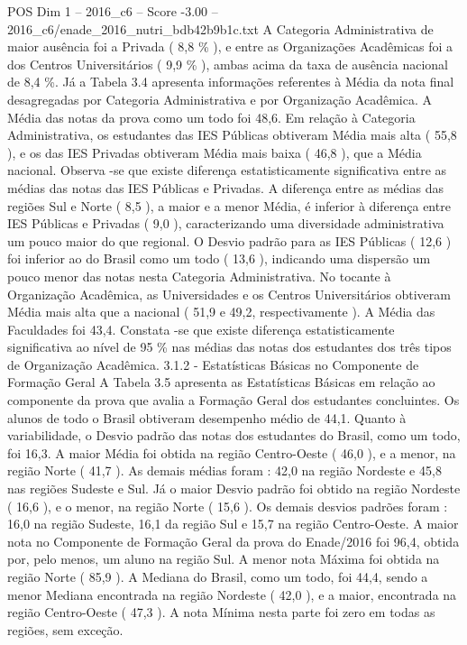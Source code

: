 \begin{textsample}{POS Dim 1 – 2016\_c6 – Score -3.00 – 2016\_c6/enade\_2016\_nutri\_bdb42b9b1c.txt}
A Categoria Administrativa de maior ausência foi a Privada ( 8,8 \% ), e entre as Organizações Acadêmicas foi a dos Centros Universitários ( 9,9 \% ), ambas acima da taxa de ausência nacional de 8,4 \%.
Já a Tabela 3.4 apresenta informações referentes à Média da nota final desagregadas por Categoria Administrativa e por Organização Acadêmica.
A Média das notas da prova como um todo foi 48,6.
Em relação à Categoria Administrativa, os estudantes das IES Públicas obtiveram Média mais alta ( 55,8 ), e os das IES Privadas obtiveram Média mais baixa ( 46,8 ), que a Média nacional.
Observa -se que existe diferença estatisticamente significativa entre as médias das notas das IES Públicas e Privadas.
A diferença entre as médias das regiões Sul e Norte ( 8,5 ), a maior e a menor Média, é inferior à diferença entre IES Públicas e Privadas ( 9,0 ), caracterizando uma diversidade administrativa um pouco maior do que regional.
O Desvio padrão para as IES Públicas ( 12,6 ) foi inferior ao do Brasil como um todo ( 13,6 ), indicando uma dispersão um pouco menor das notas nesta Categoria Administrativa.
No tocante à Organização Acadêmica, as Universidades e os Centros Universitários obtiveram Média mais alta que a nacional ( 51,9 e 49,2, respectivamente ).
A Média das Faculdades foi 43,4.
Constata -se que existe diferença estatisticamente significativa ao nível de 95 \% nas médias das notas dos estudantes dos três tipos de Organização Acadêmica. 3.1.2 - Estatísticas Básicas no Componente de Formação Geral A Tabela 3.5 apresenta as Estatísticas Básicas em relação ao componente da prova que avalia a Formação Geral dos estudantes concluintes.
Os alunos de todo o Brasil obtiveram desempenho médio de 44,1.
Quanto à variabilidade, o Desvio padrão das notas dos estudantes do Brasil, como um todo, foi 16,3.
A maior Média foi obtida na região Centro-Oeste ( 46,0 ), e a menor, na região Norte ( 41,7 ).
As demais médias foram : 42,0 na região Nordeste e 45,8 nas regiões Sudeste e Sul.
Já o maior Desvio padrão foi obtido na região Nordeste ( 16,6 ), e o menor, na região Norte ( 15,6 ).
Os demais desvios padrões foram : 16,0 na região Sudeste, 16,1 da região Sul e 15,7 na região Centro-Oeste.
A maior nota no Componente de Formação Geral da prova do Enade/2016 foi 96,4, obtida por, pelo menos, um aluno na região Sul.
A menor nota Máxima foi obtida na região Norte ( 85,9 ).
A Mediana do Brasil, como um todo, foi 44,4, sendo a menor Mediana encontrada na região Nordeste ( 42,0 ), e a maior, encontrada na região Centro-Oeste ( 47,3 ).
A nota Mínima nesta parte foi zero em todas as regiões, sem exceção.

\end{textsample}
